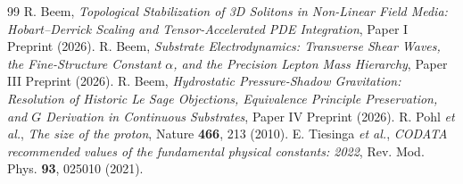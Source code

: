 \documentclass[11pt,a4paper]{article}
\begin{document}
	\begin{thebibliography}{99}
		 R. Beem, \textit{Topological Stabilization of 3D Solitons in Non-Linear Field Media: Hobart--Derrick Scaling and Tensor-Accelerated PDE Integration}, Paper I Preprint (2026).
		 R. Beem, \textit{Substrate Electrodynamics: Transverse Shear Waves, the Fine-Structure Constant $\alpha$, and the Precision Lepton Mass Hierarchy}, Paper III Preprint (2026).
		 R. Beem, \textit{Hydrostatic Pressure-Shadow Gravitation: Resolution of Historic Le Sage Objections, Equivalence Principle Preservation, and $G$ Derivation in Continuous Substrates}, Paper IV Preprint (2026).
		 R. Pohl \textit{et al.}, \textit{The size of the proton}, Nature \textbf{466}, 213 (2010).
		 E. Tiesinga \textit{et al.}, \textit{CODATA recommended values of the fundamental physical constants: 2022}, Rev. Mod. Phys. \textbf{93}, 025010 (2021).
	\end{thebibliography}
	
\end{document}
